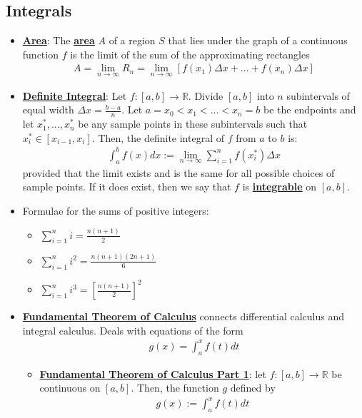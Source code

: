 \documentclass[reqno,11pt]{amsart}
\theoremstyle{definition}
\theoremstyle{remark}
\newcommand{\R}{\mathbb{R}}
\newcommand{\dfn}[1]{\underline{\textbf{#1}}}
\begin{document}
\subsection{Integrals}
\begin{itemize}[noitemsep]
	\item \dfn{Area}: The \dfn{area} $A$ of a region $S$ that lies under the graph of a continuous function $f$ is the limit of the sum of the approximating rectangles 
	\begin{align}
		A = \lim_{n \rightarrow \infty} R_n = \lim_{n \rightarrow \infty} [ f(x_1) \Delta x + ...  + f(x_n) \Delta x ]	
	\end{align}
	\item \dfn{Definite Integral}: Let $f: [a,b] \rightarrow \R$. Divide $[a,b]$ into $n$ subintervals of equal width $\Delta x = \frac{b-a}{n}$. Let $a = x_0 < x_1 < ... < x_n =b$ be the endpoints and let $x_1^*, ..., x_n^*$ be any sample points in these subintervals such that $x_i^*  \in [x_{i-1}, x_i]$. Then, the definite integral of $f$ from $a$ to $b$ is: 
	\begin{align}
		\int_a^b f(x) dx := \lim_{n \rightarrow \infty} \sum_{i=1}^n f(x_i^*) \Delta x	
	\end{align}
	provided that the limit exists and is the same for all possible choices of sample points. If it does exist, then we say that $f$ is \dfn{integrable} on $[a,b]$.
	\item Formulae for the sums of positive integers: 
	\begin{itemize}[noitemsep]
		\item $ \sum_{i=1}^n i = \frac{n(n+1)}{2} $
		\item $ \sum_{i=1}^n i^2 = \frac{n(n+1)(2n+1)}{6} $
		\item $ \sum_{i=1}^n i^3 = \left[  \frac{n(n+1)}{2} \right]^2 $
	\end{itemize}
	\item \dfn{Fundamental Theorem of Calculus} connects differential calculus and integral calculus. Deals with equations of the form
	\begin{align}
		g(x) = \int_a^x f(t) dt 	
	\end{align}
	\begin{itemize}[noitemsep]
		\item \dfn{Fundamental Theorem of Calculus Part 1}: let $f: [a,b] \rightarrow \R$ be continuous on $[a,b]$. Then, the function $g$ defined by
		\begin{align}
			g(x) := \int_a^x f(t) dt 	
		\end{align}

\end{itemize}
\end{itemize}
\end{document}
